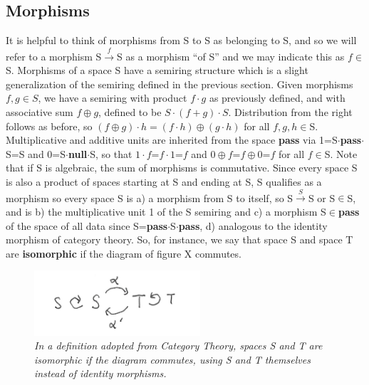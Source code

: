 \documentclass[11pt]{article}
\begin{document}
\subsection{Morphisms} 

     It is helpful to think of morphisms from S to S as belonging to S, and so we will refer to a morphism S${\overset f\longrightarrow}$S as a morphism ``of S'' and we may indicate this as $f\in$ S.
Morphisms of a space S have a semiring structure which is a slight generalization of the semiring defined in the previous section.  Given morphisms $f, g\in S$, we have a semiring with 
product $f\cdot g$ as previously defined, and with associative sum $f\oplus g$, defined to be $S\cdot (f+g) \cdot S$.  
Distribution from the right follows as before, so $(f\oplus g)\cdot h = (f\cdot h)\oplus (g\cdot h)$ for all $f,g,h\in$S.  
Multiplicative and additive units are inherited from the space {\bf pass} via 1=S$\cdot${\bf pass}$\cdot$S=S and 0=S$\cdot${\bf null}$\cdot$S, so that 
$1\cdot f$=$f\cdot 1$=$f$ and $0\oplus f$=$f\oplus 0$=$f$ for all $f\in$S. Note that if S is algebraic, the sum of morphisms is commutative.  
Since every space S is also a product of spaces starting at S and ending at S, S qualifies as a morphism so every space S is a) a morphism 
from S to itself, so S${\overset S\rightarrow}$S or S$\in$S, and is b) the multiplicative unit 1 of the S semiring and c) a morphism S$\in${\bf pass} of the space of all data 
since S={\bf pass}$\cdot$S$\cdot${\bf pass}, d) analogous to the identity morphism of category theory.  So, for instance, we say that space S and space T are {\bf isomorphic} 
if the diagram of figure X commutes.   

\begin{figure}[h]
\centering
\includegraphics[width=0.55\textwidth]{isomorphism.png}
\caption{{\it In a definition adopted from Category Theory, spaces S and T are isomorphic if the diagram commutes, using S and T themselves instead of identity morphisms.}}
\end{figure}
\end{document}

